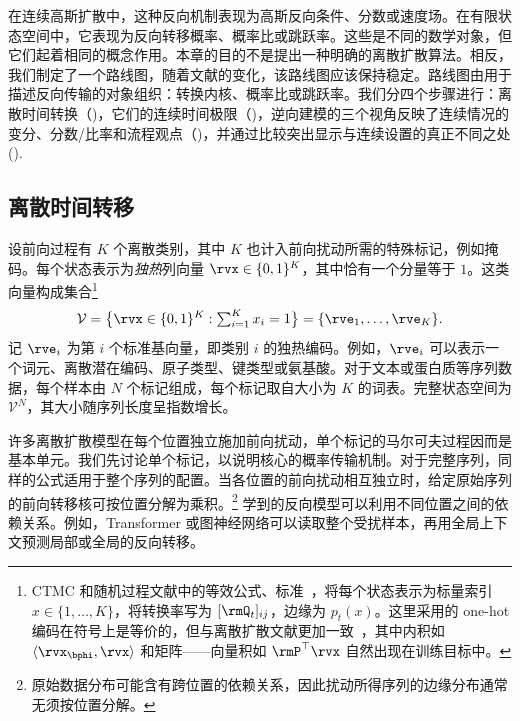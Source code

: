 
在连续高斯扩散中，这种反向机制表现为高斯反向条件、分数或速度场。在有限状态空间中，它表现为反向转移概率、概率比或跳跃率。这些是不同的数学对象，但它们起着相同的概念作用。本章的目的不是提出一种明确的离散扩散算法。相反，我们制定了一个路线图，随着文献的变化，该路线图应该保持稳定。路线图由用于描述反向传输的对象组织：转换内核、概率比或跳跃率。我们分四个步骤进行：离散时间转换（)，它们的连续时间极限（)，逆向建模的三个视角反映了连续情况的变分、分数/比率和流程观点（)，并通过比较突出显示与连续设置的真正不同之处 ().

\subsection{离散时间转移}
\label{subsec:epilogue-dtmc}

设前向过程有 $K$ 个离散类别，其中 $K$ 也计入前向扰动所需的特殊标记，例如掩码。每个状态表示为\emph{独热}列向量 $\rvx\in\{0,1\}^{K}$，其中恰有一个分量等于 $1$。这类向量构成集合\footnote{CTMC 和随机过程文献中的等效公式、标准~\citep{norris1998markov,kelly1979reversibility}，将每个状态表示为标量索引 $x\in\{1,\dots,K\}$，将转换率写为 $[\rmQ_t]_{ij}$，边缘为 $p_t(x)$。这里采用的 one-hot 编码在符号上是等价的，但与离散扩散文献更加一致~\citep{austin2021structured,sahoo2024simple,lou2024discrete}，其中内积如 $\langle\rvx_{\bphi},\rvx\rangle$ 和矩阵——向量积如 $\rmP^{\top}\rvx$ 自然出现在训练目标中。}
\[
\mathcal{V}
= \bigl\{\rvx\in\{0,1\}^{K}:\textstyle\sum_{i=1}^{K}x_i=1\bigr\}
= \{\rve_1,\ldots,\rve_K\}.
\]
记 $\rve_i$ 为第 $i$ 个标准基向量，即类别 $i$ 的独热编码。例如，$\rve_i$ 可以表示一个词元、离散潜在编码、原子类型、键类型或氨基酸。对于文本或蛋白质等序列数据，每个样本由 $N$ 个标记组成，每个标记取自大小为 $K$ 的词表。完整状态空间为 $\mathcal{V}^N$，其大小随序列长度呈指数增长。

许多离散扩散模型在每个位置独立施加前向扰动，单个标记的马尔可夫过程因而是基本单元。我们先讨论单个标记，以说明核心的概率传输机制。对于完整序列，同样的公式适用于整个序列的配置。当各位置的前向扰动相互独立时，给定原始序列的前向转移核可按位置分解为乘积。\footnote{原始数据分布可能含有跨位置的依赖关系，因此扰动所得序列的边缘分布通常无须按位置分解。}
学到的反向模型可以利用不同位置之间的依赖关系。例如，Transformer 或图神经网络可以读取整个受扰样本，再用全局上下文预测局部或全局的反向转移。

